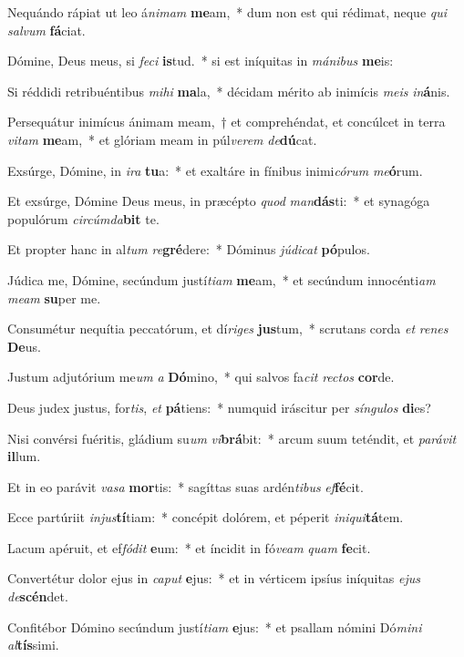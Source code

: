 \item Nequándo rápiat ut leo á\textit{ni}\textit{mam} \textbf{me}am,~* dum non est qui rédimat, neque \textit{qui} \textit{sal}\textit{vum} \textbf{fá}ciat.
\item Dómine, Deus meus, si \textit{fe}\textit{ci} \textbf{is}tud.~* si est iníquitas in \textit{má}\textit{ni}\textit{bus} \textbf{me}is:
\item Si réddidi retribuéntibus \textit{mi}\textit{hi} \textbf{ma}la,~* décidam mérito ab inimícis \textit{me}\textit{is} \textit{in}\textbf{á}nis.
\item Persequátur inimícus ánimam meam,~† et comprehéndat, et concúlcet in terra \textit{vi}\textit{tam} \textbf{me}am,~* et glóriam meam in púl\textit{ve}\textit{rem} \textit{de}\textbf{dú}cat.
\item Exsúrge, Dómine, in \textit{i}\textit{ra} \textbf{tu}a:~* et exaltáre in fínibus inimi\textit{có}\textit{rum} \textit{me}\textbf{ó}rum.
\item Et exsúrge, Dómine Deus meus, in præcépto \textit{quod} \textit{man}\textbf{dás}ti:~* et synagóga populórum \textit{cir}\textit{cúm}\textit{da}\textbf{bit} te.
\item Et propter hanc in al\textit{tum} \textit{re}\textbf{gré}dere:~* Dóminus \textit{jú}\textit{di}\textit{cat} \textbf{pó}pulos.
\item Júdica me, Dómine, secúndum justí\textit{ti}\textit{am} \textbf{me}am,~* et secúndum innocénti\textit{am} \textit{me}\textit{am} \textbf{su}per me.
\item Consumétur nequítia peccatórum, et dí\textit{ri}\textit{ges} \textbf{jus}tum,~* scrutans corda \textit{et} \textit{re}\textit{nes} \textbf{De}us.
\item Justum adjutórium me\textit{um} \textit{a} \textbf{Dó}mino,~* qui salvos fa\textit{cit} \textit{rec}\textit{tos} \textbf{cor}de.
\item Deus judex justus, for\textit{tis}, \textit{et} \textbf{pá}tiens:~* numquid iráscitur per \textit{sín}\textit{gu}\textit{los} \textbf{di}es?
\item Nisi convérsi fuéritis, gládium su\textit{um} \textit{vi}\textbf{brá}bit:~* arcum suum teténdit, et \textit{pa}\textit{rá}\textit{vit} \textbf{il}lum.
\item Et in eo parávit \textit{va}\textit{sa} \textbf{mor}tis:~* sagíttas suas ardén\textit{ti}\textit{bus} \textit{ef}\textbf{fé}cit.
\item Ecce partúriit \textit{in}\textit{jus}\textbf{tí}tiam:~* concépit dolórem, et péperit \textit{in}\textit{i}\textit{qui}\textbf{tá}tem.
\item Lacum apéruit, et ef\textit{fó}\textit{dit} \textbf{e}um:~* et íncidit in fó\textit{ve}\textit{am} \textit{quam} \textbf{fe}cit.
\item Convertétur dolor ejus in \textit{ca}\textit{put} \textbf{e}jus:~* et in vérticem ipsíus iníquitas \textit{e}\textit{jus} \textit{de}\textbf{scén}det.
\item Confitébor Dómino secúndum justí\textit{ti}\textit{am} \textbf{e}jus:~* et psallam nómini Dó\textit{mi}\textit{ni} \textit{al}\textbf{tís}simi.
